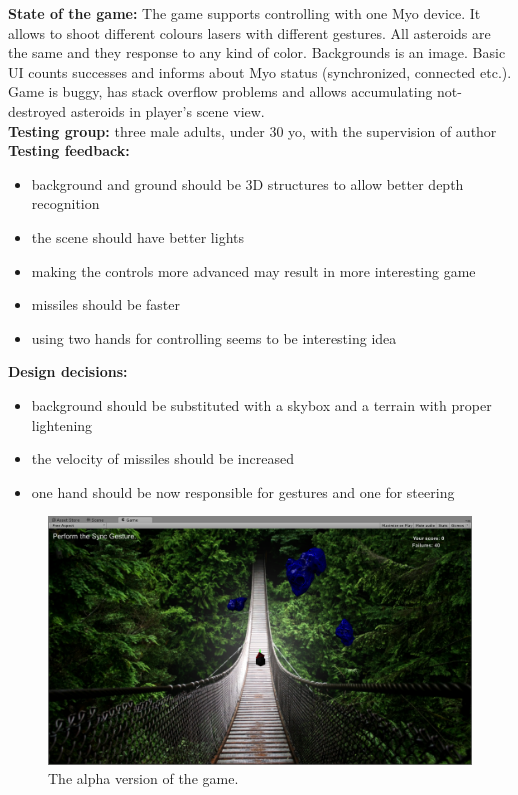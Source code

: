 \textbf{State of the game:} The game supports controlling with one Myo device. It allows to shoot different colours lasers with different gestures. All asteroids are the same and they response to any kind of color. Backgrounds is an image. Basic UI counts successes and informs about Myo status (synchronized, connected etc.). Game is buggy, has stack overflow problems and allows accumulating not-destroyed asteroids in player's scene view.
\\
\textbf{Testing group:} three male adults, under 30 yo, with the supervision of author
\\
\textbf{Testing feedback:} 
\begin{itemize}
\item background and ground should be 3D structures to allow better depth recognition
\item the scene should have better lights
\item making the controls more advanced may result in more interesting game
\item missiles should be faster
\item using two hands for controlling seems to be interesting idea
\end{itemize}


\textbf{Design decisions:}
\begin{itemize}
\item background should be substituted with a skybox and a terrain with proper lightening 
\item the velocity of missiles should be increased
\item one hand should be now responsible for gestures and one for steering
\end{itemize}
\begin{figure}
\includegraphics[width=\textwidth]{graphics/screen_v1.png} 
\caption{The alpha version of the game.}
\end{figure}

